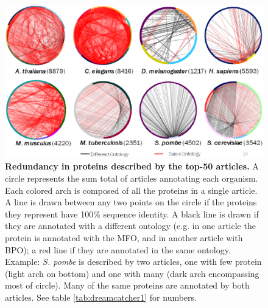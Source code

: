 \documentclass[12pt]{article}
\begin{document}
\begin{figure}[!ht] 
\begin{center} 
\includegraphics[width=7in]{dreamcatcher1.eps} 
\end{center}
\caption{ {\bf Redundancy in proteins described by the top-50 articles.} A circle represents the sum
total of articles annotating each organism. Each colored arch is composed of all the proteins in a
single article. A line is drawn between any two points on the circle if the proteins they represent
have 100\% sequence identity. A black line is drawn if they are annotated with a different ontology
(e.g.  in one article the protein is annotated with the MFO, and in another article with BPO); a red
line if they are annotated in the same ontology. Example: \textit{S. pombe} is described by two
articles, one with few protein (light arch on bottom) and one with many (dark arch encompassing most
of circle). Many of the same proteins are annotated by both articles. See table
\ref{tab:dreamcatcher1} for numbers.} 
\label{fig:dreamcatcher1} 
\end{figure}
\newpage
\end{document}
